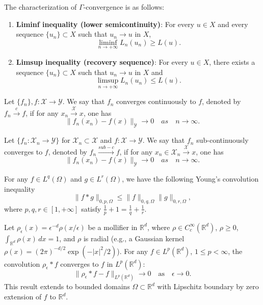 \documentclass{amsart}
\begin{document}
\begin{definition}
    The characterization of \(\Gamma\)-convergence is as follows: 
    \begin{enumerate}
        \item \textbf{Liminf inequality (lower semicontinuity)}: For every $ u \in X $ and every sequence $ \{u_n\} \subset X $ such that $ u_n \to u $ in $ X $,
        $$\liminf_{n \to +\infty} L_n(u_n) \geq L(u).$$
        \item \textbf{Limsup inequality (recovery sequence)}: For every $ u \in X $, there exists a sequence $ \{u_n\} \subset X $ such that $ u_n \to u $ in $ X $ and
        $$\limsup_{n \to +\infty} L_n(u_n) \leq L(u).$$
    \end{enumerate}
\end{definition}
\begin{definition}
    Let \(\{f_n\},f: \mathcal{X\to Y}\). We say that \(f_n\) converges continuously to \(f\), denoted by $f_n\stackrel{c}{\longrightarrow}f$, if for any \(x_n \stackrel{\mathcal{X}}{\to} x\), one has 
    $$\|f_n(x_n) - f(x)\|_\mathcal{Y} \to 0 \quad as\quad n \to \infty.$$
\end{definition}
\begin{definition}
    Let $\{f_n:\mathcal{X}_n\to \mathcal{Y}\}$ for $\mathcal{X}_n\subset \mathcal{X}$ and $f: \mathcal{X\to Y}$. We say that \(f_n\) sub-continuously converges to \(f\), denoted by $f_n\stackrel{sub-c}{\longrightarrow}f$, if for any \(x_n\in\mathcal{X}_n \stackrel{\mathcal{X}}{\longrightarrow} x\), one has 
    $$\|f_n(x_n) - f(x)\|_\mathcal{Y} \to 0 \quad as\quad n \to \infty.$$
    \end{definition}
\begin{lemma}\label{Young_inequality}
 For any $f\in L^q(\Omega)$ and $g\in L^r(\Omega)$, we have the following Young's convolution inequality
\[
\|f * g\|_{0,p,\Omega} \leq \|f\|_{0,q,\Omega} \|g\|_{0,r,\Omega},
\]
where \( p, q, r\in [1,+\infty] \) satisfy \( \frac{1}{p} + 1 = \frac{1}{q} + \frac{1}{r} \).
\end{lemma}
\begin{lemma}
    \label{mollifier_convergence}
    Let \( \rho_\epsilon(x) = \epsilon^{-d} \rho(x/\epsilon) \) be a mollifier in \( \mathbb{R}^d \), where \( \rho \in C_c^\infty(\mathbb{R}^d) \), \( \rho \geq 0 \), \( \int_{\mathbb{R}^d} \rho(x) \, dx = 1 \), and \( \rho \) is radial (e.g., a Gaussian kernel \( \rho(x) = (2\pi)^{-d/2} \exp(-|x|^2/2) \)). For any \( f \in L^p(\mathbb{R}^d) \), \( 1 \leq p < \infty \), the convolution \( \rho_\epsilon * f \) converges to \( f \) in \( L^p(\mathbb{R}^d) \):
    \[
    \|\rho_\epsilon * f - f\|_{L^p(\mathbb{R}^d)} \to 0 \quad \text{as} \quad \epsilon \to 0.
    \]
    This result extends to bounded domains \( \Omega \subset \mathbb{R}^d \) with Lipschitz boundary by zero extension of \( f\) to \( \mathbb{R}^d \).
\end{lemma}
\end{document}
